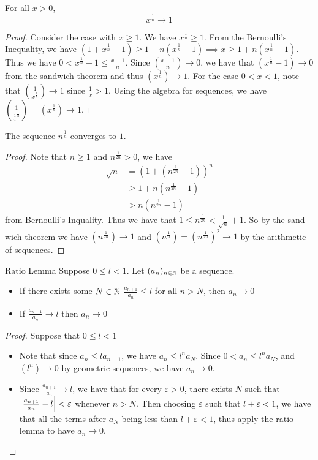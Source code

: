 \documentclass[a4paper]{article}
\begin{document}
\begin{thm}{}{} For all $x>0$, $$x^{\frac{1}{n}}\to 1$$ \tcbline
\begin{proof} Consider the case with $x\geq1$. We have $x^\frac{1}{n}\geq1$. From the Bernoulli's Inequality, we have $\left(1+x^\frac{1}{n}-1\right)\geq1+n\left(x^\frac{1}{n}-1\right)\implies x\geq1+n\left(x^\frac{1}{n}-1\right)$.  Thus we have $0<x^\frac{1}{n}-1\leq\frac{x-1}{n}$. Since $\left(\frac{x-1}{n}\right)\to0$, we have that $\left(x^\frac{1}{n}-1\right)\to0$ from the sandwich theorem and thus $\left(x^\frac{1}{n}\right)\to1$. For the case $0<x<1$, note that $\left(\frac{1}{x^\frac{1}{n}}\right)\to1$ since $\frac{1}{x}>1$. Using the algebra for sequences, we have $\left(\frac{1}{\frac{1}{x}^{\frac{1}{n}}}\right)=\left(x^\frac{1}{n}\right)\to1$. 
\end{proof}
\end{thm}

\begin{thm}{}{} The sequence $n^{\frac{1}{n}}$ converges to $1$. \tcbline
\begin{proof} Note that $n\geq1$ and $n^\frac{1}{2n}>0$, we have 
\begin{align*}
\sqrt{n}&=(1+(n^\frac{1}{2n}-1))^n \\
&\geq1+n(n^\frac{1}{2n}-1) \\
&>n(n^\frac{1}{2n}-1)
\end{align*}
from Bernoulli's Inquality. Thus we have that $1\leq n^\frac{1}{2n}<\frac{1}{\sqrt{n}}+1$. So by the sand wich theorem we have $(n^\frac{1}{2n})\to1$ and $(n^\frac{1}{n})=(n^\frac{1}{2n})^2\to1$ by the arithmetic of sequences. 
\end{proof}
\end{thm}

\begin{thm}{Ratio Lemma}{} Suppose $0\leq l<1$. Let $(a_n)_{n\in\mathbb{N}}$ be a sequence. 
\begin{itemize}
\item If there exists some $N\in\mathbb{N}$ $\frac{a_{n+1}}{a_n}\leq l$ for all $n>N$, then $a_n\to 0$
\item If $\frac{a_{n+1}}{a_n}\to l$ then $a_n\to0$
\end{itemize}\tcbline
\begin{proof} Suppose that $0\leq l<1$
\begin{itemize}
\item Note that since $a_n\leq la_{n-1}$, we have $a_n\leq l^na_N$. Since $0<a_n\leq l^na_N$, and $(l^n)\to 0$ by geometric sequences, we have $a_n\to 0$. 
\item Since $\frac{a_{n+1}}{a_n}\to l$, we have that for every $\varepsilon>0$, there exists $N$ such that $\abs{\frac{a_{n+1}}{a_n}-l}<\varepsilon$ whenever $n>N$. Then choosing $\varepsilon$ such that $l+\varepsilon<1$, we have that all the terms after $a_N$ being less than $l+\varepsilon<1$, thus apply the ratio lemma to have $a_n\to 0$. 
\end{itemize}
\end{proof}
\end{thm}
\end{document}
